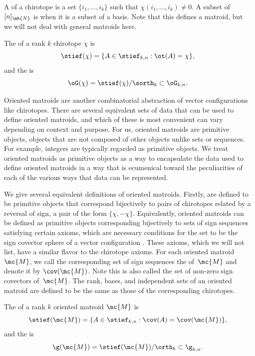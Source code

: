 A  of a chirotope is a set $\{i_1,\dots,i_k\}$ such that $\chi(i_1,\dots,i_k) \neq 0$.
A subset of~$[n]_\mb{N}$ is  when it is a subset of a basis.
Note that this defines a matroid, but we will not deal with general matroids here.

The  of a rank $k$ chirotope $\chi$ is
\[ \stief(\chi) =
\{ A \in \stief_{k,n}:\ot (A) = \chi\},
\]
and the  is
\[ \oG(\chi) = \stief(\chi)/\sorth_k \subset \oG_{k,n}. \]

Oriented matroids are another combinatorial abstraction of vector configurations like chirotopes.
There are several equivalent sets of data that can be used to define oriented matroids, and which of these is most convenient can vary depending on context and purpose.
For us, oriented matroids are primitive objects, \ie objects that are not composed of other objects unlike sets or sequences. For example, integers are typically regarded as primitive objects.
We treat oriented matroids as primitive objects as a way to encapsulate the data used to define oriented matroids in a way that is ecumenical toward the peculiarities of each of the various ways that data can be represented.

We give several equivalent definitions of oriented matroids.
Firstly,  are defined to be primitive objects that correspond bijectively to pairs of chirotopes related by a reversal of sign, \ie a pair of the form $\{\chi,-\chi\}$.
Equivalently, oriented matroids can be defined as primitive objects corresponding bijectively to sets of sign sequences satisfying certain axioms, which are necessary conditions for the set to be the sign covector sphere of a vector configuration \cite[\S 3.7]{bjorner1999oriented}.
These axioms, which we will not list, have a similar flavor to the chirotope axioms.
For each oriented matroid $\mc{M}$, we call the corresponding set of sign sequences the  of~$\mc{M}$ and denote it by $\cov(\mc{M})$.
Note this is also called the set of non-zero sign covectors of~$\mc{M}$.
The rank, bases, and independent sets of an oriented matroid are defined to be the same as those of the corresponding chirotopes.

The  of a rank $k$ oriented matroid $\mc{M}$ is
\[ \stief(\mc{M}) =
\{ A \in \stief_{k,n}:\cov (A) = \cov(\mc{M})\},
\]
and the  is
\[ \g(\mc{M}) = \stief(\mc{M})/\orth_k \subset \g_{k,n}. \]

